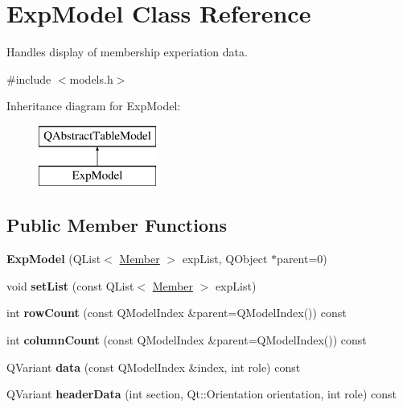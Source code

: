 \hypertarget{class_exp_model}{}\section{Exp\+Model Class Reference}
\label{class_exp_model}


Handles display of membership experiation data.  




{\ttfamily \#include $<$models.\+h$>$}

Inheritance diagram for Exp\+Model\+:\begin{figure}[H]
\begin{center}
\leavevmode
\includegraphics[height=2.000000cm]{class_exp_model}
\end{center}
\end{figure}
\subsection*{Public Member Functions}
\begin{DoxyCompactItemize}
\item 
\mbox{\label{class_exp_model_adff2d18f1647b705f1ee84b905948290}} 
{\bfseries Exp\+Model} (Q\+List$<$ \mbox{\hyperlink{class_member}{Member}} $>$ exp\+List, Q\+Object $\ast$parent=0)
\item 
\mbox{\label{class_exp_model_a8c9764a37df074a7dc5017048319a2bd}} 
void {\bfseries set\+List} (const Q\+List$<$ \mbox{\hyperlink{class_member}{Member}} $>$ exp\+List)
\item 
\mbox{\label{class_exp_model_a667a2e950adcb8674af757803038128f}} 
int {\bfseries row\+Count} (const Q\+Model\+Index \&parent=Q\+Model\+Index()) const
\item 
\mbox{\label{class_exp_model_a01fe094199a35d3261e9acd98fc9e628}} 
int {\bfseries column\+Count} (const Q\+Model\+Index \&parent=Q\+Model\+Index()) const
\item 
\mbox{\label{class_exp_model_a87560b7dd140aa197c7bca63862263fc}} 
Q\+Variant {\bfseries data} (const Q\+Model\+Index \&index, int role) const
\item 
\mbox{\label{class_exp_model_a44642d83b224f2bf455073615ea2e68e}} 
Q\+Variant {\bfseries header\+Data} (int section, Qt\+::\+Orientation orientation, int role) const
\end{DoxyCompactItemize}
